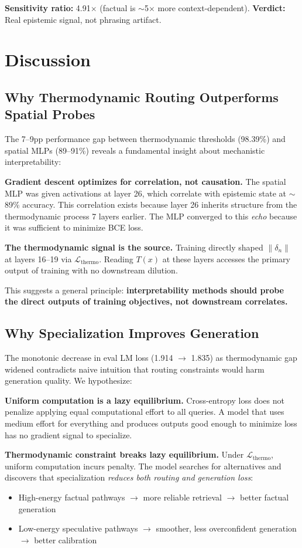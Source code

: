 \documentclass[11pt,a4paper]{article}
\begin{document}
\textbf{Sensitivity ratio:} 4.91$\times$ (factual is $\sim$5$\times$ more context-dependent). \textbf{Verdict:} Real epistemic signal, not phrasing artifact.

\section{Discussion}

\subsection{Why Thermodynamic Routing Outperforms Spatial Probes}

The 7--9pp performance gap between thermodynamic thresholds (98.39\%) and spatial MLPs (89--91\%) reveals a fundamental insight about mechanistic interpretability:

\textbf{Gradient descent optimizes for correlation, not causation.} The spatial MLP was given activations at layer 26, which correlate with epistemic state at $\sim$89\% accuracy. This correlation exists because layer 26 inherits structure from the thermodynamic process 7 layers earlier. The MLP converged to this \emph{echo} because it was sufficient to minimize BCE loss.

\textbf{The thermodynamic signal is the source.} Training directly shaped $\|\delta_n\|$ at layers 16--19 via $\mathcal{L}_\text{thermo}$. Reading $T(x)$ at these layers accesses the primary output of training with no downstream dilution.

This suggests a general principle: \textbf{interpretability methods should probe the direct outputs of training objectives, not downstream correlates.}

\subsection{Why Specialization Improves Generation}

The monotonic decrease in eval LM loss (1.914 $\rightarrow$ 1.835) as thermodynamic gap widened contradicts naive intuition that routing constraints would harm generation quality. We hypothesize:

\textbf{Uniform computation is a lazy equilibrium.} Cross-entropy loss does not penalize applying equal computational effort to all queries. A model that uses medium effort for everything and produces outputs good enough to minimize loss has no gradient signal to specialize.

\textbf{Thermodynamic constraint breaks lazy equilibrium.} Under $\mathcal{L}_\text{thermo}$, uniform computation incurs penalty. The model searches for alternatives and discovers that specialization \emph{reduces both routing and generation loss}:
\begin{itemize}
\item High-energy factual pathways $\rightarrow$ more reliable retrieval $\rightarrow$ better factual generation
\item Low-energy speculative pathways $\rightarrow$ smoother, less overconfident generation $\rightarrow$ better calibration
\end{itemize}
\end{document}
